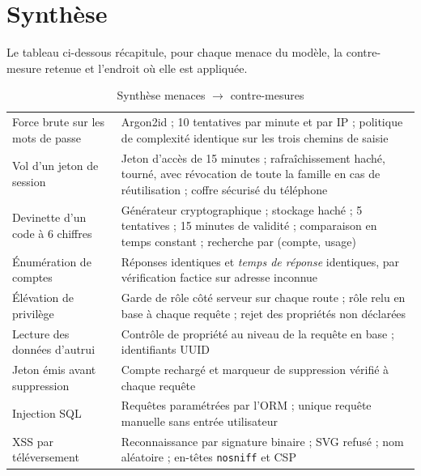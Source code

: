 \section{Synthèse}

Le tableau ci-dessous récapitule, pour chaque menace du modèle, la
contre-mesure retenue et l'endroit où elle est appliquée.

\begin{table}[H]
\centering
\caption{Synthèse menaces $\rightarrow$ contre-mesures}
\label{tab:synthese-securite}
\begin{tabularx}{\textwidth}{L{4.2cm} X}
\toprule
{} &  \\
\midrule
Force brute sur les mots de passe &
Argon2id ; 10 tentatives par minute et par IP ; politique de complexité
identique sur les trois chemins de saisie \\

Vol d'un jeton de session &
Jeton d'accès de 15 minutes ; rafraîchissement haché, tourné, avec révocation
de toute la famille en cas de réutilisation ; coffre sécurisé du téléphone \\

Devinette d'un code à 6 chiffres &
Générateur cryptographique ; stockage haché ; 5 tentatives ; 15 minutes de
validité ; comparaison en temps constant ; recherche par (compte, usage) \\

Énumération de comptes &
Réponses identiques et \emph{temps de réponse} identiques, par vérification
factice sur adresse inconnue \\

Élévation de privilège &
Garde de rôle côté serveur sur chaque route ; rôle relu en base à chaque
requête ; rejet des propriétés non déclarées \\

Lecture des données d'autrui &
Contrôle de propriété au niveau de la requête en base ; identifiants UUID \\

Jeton émis avant suppression &
Compte rechargé et marqueur de suppression vérifié à chaque requête \\

Injection SQL &
Requêtes paramétrées par l'ORM ; unique requête manuelle sans entrée
utilisateur \\

XSS par téléversement &
Reconnaissance par signature binaire ; SVG refusé ; nom aléatoire ; en-têtes
\texttt{nosniff} et CSP \\


\end{tabularx}
\end{table}
